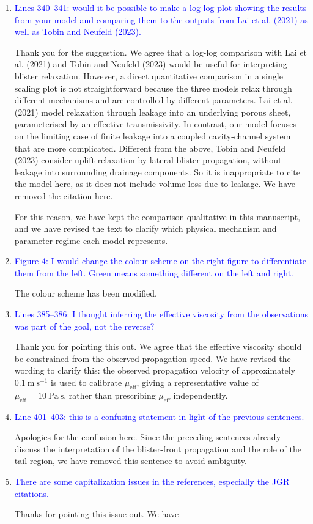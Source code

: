 \documentclass[11pt]{article}
\begin{document}
\begin{enumerate}
\item \textcolor{blue}{Lines 340--341: would it be possible to make a log-log plot showing the results from your model and comparing them to the outputs from Lai et al. (2021) as well as Tobin and Neufeld (2023).}

Thank you for the suggestion. We agree that a log-log comparison with Lai et al. (2021) and Tobin and Neufeld (2023) would be useful for interpreting blister relaxation. However, a direct quantitative comparison in a single scaling plot is not straightforward because the three models relax through different mechanisms and are controlled by different parameters. Lai et al. (2021) model relaxation through leakage into an underlying porous sheet, parameterised by an effective transmissivity. In contrast, our model focuses on the limiting case of finite leakage into a coupled cavity-channel system that are more complicated. Different from the above, Tobin and Neufeld (2023) consider uplift relaxation by lateral blister propagation, without leakage into surrounding drainage components. So it is inappropriate to cite the model here, as it does not include volume loss due to leakage. We have removed the citation here.

For this reason, we have kept the comparison qualitative in this manuscript, and we have revised the text to clarify which physical mechanism and parameter regime each model represents.

\item \textcolor{blue}{Figure 4: I would change the colour scheme on the right figure to differentiate them from the left. Green means something different on the left and right.}

The colour scheme has been modified.

\item \textcolor{blue}{Lines 385--386: I thought inferring the effective viscosity from the observations was part of the goal, not the reverse?}

Thank you for pointing this out. We agree that the effective viscosity should be constrained from the observed propagation speed. We have revised the wording to clarify this: the observed propagation velocity of approximately \(0.1~\mathrm{m~s^{-1}}\) is used to calibrate \(\mu_{\mathrm{eff}}\), giving a representative value of \(\mu_{\mathrm{eff}}=10~\mathrm{Pa~s}\), rather than prescribing \(\mu_{\mathrm{eff}}\) independently.

\item \textcolor{blue}{Line 401--403: this is a confusing statement in light of the previous sentences.}

Apologies for the confusion here. Since the preceding sentences already discuss the interpretation of the blister-front propagation and the role of the tail region, we have removed this sentence to avoid ambiguity.

\item \textcolor{blue}{There are some capitalization issues in the references, especially the JGR citations.}

Thanks for pointing this issue out. We have 

\end{enumerate}
\end{document}
